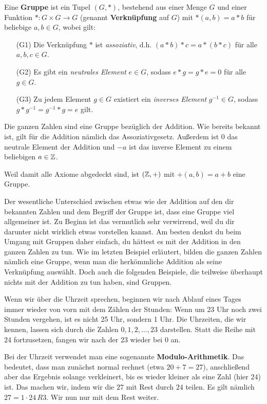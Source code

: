 \documentclass[../../main.tex]{subfiles}
\begin{document}
\begin{definition}
    Eine \textbf{Gruppe} ist ein Tupel $(G,*)$, bestehend aus einer Menge $G$ und einer Funktion $*\colon G\times G\rightarrow G$ (genannt \textbf{Verknüpfung} auf $G$) mit $*(a,b)=a*b$ für beliebige $a,b \in G$, wobei gilt:
    \begin{enumerate}
        \item[(G1)] Die Verknüpfung $*$ ist \emph{assoziativ}, d.h. $(a*b)*c=a*(b*c)$ für alle $a,b,c\in G$.
        \item[(G2)] Es gibt ein \emph{neutrales Element} $e\in G$, sodass $e*g=g*e=0$ für alle $g\in G$.
        \item[(G3)] Zu jedem Element $g\in G$ existiert ein \emph{inverses Element} $g^{-1}\in G$, sodass $g*g^{-1}=g^{-1}*g=e$ gilt.
    \end{enumerate}
\end{definition}
\begin{advexample}
    Die ganzen Zahlen \Integer{} sind eine Gruppe bezüglich der Addition. Wie bereits bekannt ist, gilt für die Addition nämlich das Assoziativgesetz. Außerdem ist 0 das neutrale Element der Addition und $-a$ ist das inverse Element zu einem beliebigen $a\in\mathbb{Z}$.
    
    Weil damit alle Axiome abgedeckt sind, ist $(\mathbb{Z},+)$ mit $+(a,b)=a+b$ eine Gruppe.
\end{advexample}
Der wesentliche Unterschied zwischen etwas wie der Addition auf den dir bekannten Zahlen und dem Begriff der Gruppe ist, dass eine Gruppe viel allgemeiner ist. Zu Beginn ist das vermutlich sehr verwirrend, weil du dir darunter nicht wirklich etwas vorstellen kannst. Am besten denkst du beim Umgang mit Gruppen daher einfach, du hättest es mit der Addition in den ganzen Zahlen zu tun. Wie im letzten Beispiel erläutert, bilden die ganzen Zahlen nämlich eine Gruppe, wenn man die herkömmliche Addition als seine Verknüpfung auswählt. Doch auch die folgenden Beispiele, die teilweise überhaupt nichts mit der Addition zu tun haben, sind Gruppen.

\begin{advexample}
    Wenn wir über die Uhrzeit sprechen, beginnen wir nach Ablauf eines Tages immer wieder von vorn mit dem Zählen der Stunden: Wenn um 23 Uhr noch zwei Stunden vergehen, ist es nicht 25 Uhr, sondern 1 Uhr. Die Uhrzeiten, die wir kennen, lassen sich durch die Zahlen $0,1,2,\dots,23$ darstellen. Statt die Reihe mit $24$ fortzusetzen, fangen wir nach der $23$ wieder bei $0$ an.
    
    Bei der Uhrzeit verwendet man eine sogenannte \textbf{Modulo-Arithmetik}. Das bedeutet, dass man zunächst normal rechnet (etwa $20+7=27$), anschließend aber das Ergebnis solange verkleinert, bis es wieder kleiner als eine Zahl (hier $24$) ist. Das machen wir, indem wir die $27$ mit Rest durch $24$ teilen. Es gilt nämlich $27=1\cdot 24\,R3$. Wir nun nur mit dem Rest weiter.
\end{advexample}
\end{document}
